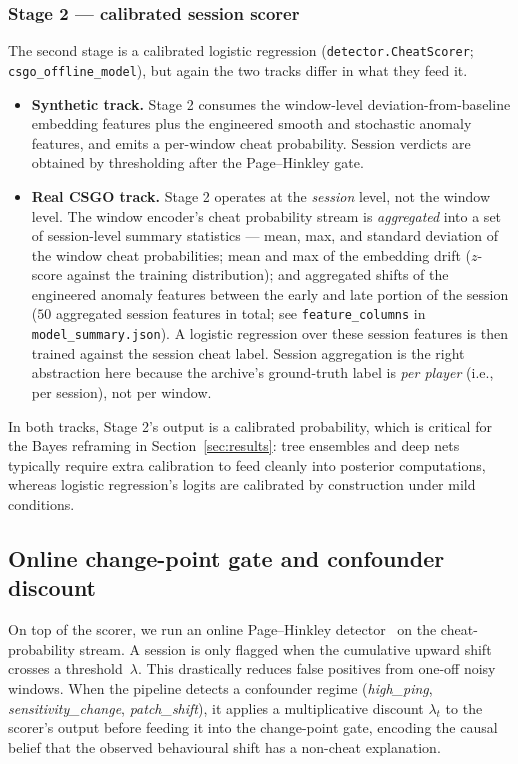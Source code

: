 \documentclass[conference,10pt]{IEEEtran}
\begin{document}
\subsubsection*{Stage 2 --- calibrated session scorer}
The second stage is a calibrated logistic regression
(\texttt{detector.CheatScorer}; \texttt{csgo\_offline\_model}), but
again the two tracks differ in what they feed it.
\begin{itemize}
  \item \textbf{Synthetic track.} Stage 2 consumes the window-level
    deviation-from-baseline embedding features plus the engineered
    smooth and stochastic anomaly features, and emits a per-window
    cheat probability. Session verdicts are obtained by thresholding
    after the Page--Hinkley gate.
  \item \textbf{Real CSGO track.} Stage 2 operates at the
    \emph{session} level, not the window level. The window encoder's
    cheat probability stream is \emph{aggregated} into a set of
    session-level summary statistics --- mean, max, and standard
    deviation of the window cheat probabilities; mean and max of the
    embedding drift ($z$-score against the training distribution);
    and aggregated shifts of the engineered anomaly features between
    the early and late portion of the session ($50$ aggregated session
    features in total; see \texttt{feature\_columns} in
    \texttt{model\_summary.json}). A logistic regression over these
    session features is then trained against the session cheat label.
    Session aggregation is the right abstraction here because the
    archive's ground-truth label is \emph{per player} (i.e., per
    session), not per window.
\end{itemize}

In both tracks, Stage 2's output is a calibrated probability, which is
critical for the Bayes reframing in Section~\ref{sec:results}:
tree ensembles and deep nets typically require extra calibration to
feed cleanly into posterior computations, whereas logistic regression's
logits are calibrated by construction under mild conditions.

\subsection{Online change-point gate and confounder discount}

On top of the scorer, we run an online Page--Hinkley
detector~\cite{page1954continuous,hinkley1971inference} on the
cheat-probability stream. A session is only flagged when the cumulative
upward shift crosses a threshold~$\lambda$. This drastically reduces
false positives from one-off noisy windows. When the pipeline detects a
confounder regime (\emph{high\_ping}, \emph{sensitivity\_change},
\emph{patch\_shift}), it applies a multiplicative discount $\lambda_t$
to the scorer's output before feeding it into the change-point gate,
encoding the causal belief that the observed behavioural shift has a
non-cheat explanation.
\end{document}
